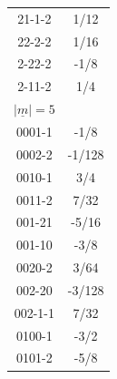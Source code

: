 \begin{tabular}[t]{|cc|}
21-1-2 & 1/12\\
22-2-2 & 1/16\\
2-22-2 & -1/8\\
2-11-2 & 1/4\\
\hline
$|\underline{m}|=5$&\\
\hline
0001-1 &  -1/8\\
0002-2 &  -1/128\\
0010-1 &  3/4\\
0011-2 &  7/32\\
001-21 &  -5/16\\
001-10 &  -3/8\\
0020-2 &  3/64\\
002-20 &  -3/128\\
002-1-1 &  7/32\\
0100-1 &  -3/2\\
0101-2 &  -5/8\\
\hline
\end{tabular}
